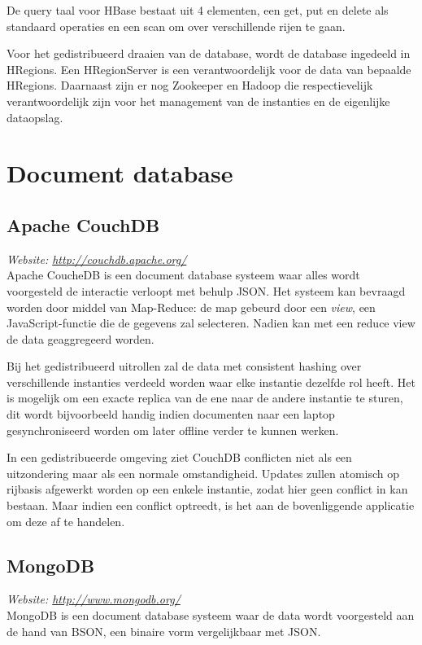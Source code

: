 De query taal voor HBase bestaat uit 4 elementen, een get, put en delete als standaard operaties en een scan om over verschillende rijen te gaan. 

Voor het gedistribueerd draaien van de database, wordt de database ingedeeld in HRegions. Een HRegionServer is een verantwoordelijk voor de data van bepaalde HRegions. Daarnaast zijn er nog Zookeeper en Hadoop die respectievelijk verantwoordelijk zijn voor het management van de instanties en de eigenlijke dataopslag.

\section{Document database}
\subsection{Apache CouchDB}
\textit{Website: \url{http://couchdb.apache.org/}}\\
Apache CoucheDB is een document database systeem waar alles wordt voorgesteld de interactie verloopt met behulp JSON. Het systeem kan bevraagd worden door middel van Map-Reduce: de map gebeurd door een \textit{view}, een JavaScript-functie die de gegevens zal selecteren. Nadien kan met een reduce view de data geaggregeerd worden. 

Bij het gedistribueerd uitrollen zal de data met consistent hashing over verschillende instanties verdeeld worden waar elke instantie dezelfde rol heeft. Het is mogelijk om een exacte replica van de ene naar de andere instantie te sturen, dit wordt bijvoorbeeld handig indien documenten naar een laptop gesynchroniseerd worden om later offline verder te kunnen werken.

In een gedistribueerde omgeving ziet CouchDB conflicten niet als een uitzondering maar als een normale omstandigheid. Updates zullen atomisch op rijbasis afgewerkt worden op een enkele instantie, zodat hier geen conflict in kan bestaan. Maar indien een conflict optreedt, is het aan de bovenliggende applicatie om deze af te handelen. 

\subsection{MongoDB}
\textit{Website: \url{http://www.mongodb.org/}}\\
MongoDB is een document database systeem waar de data wordt voorgesteld aan de hand van BSON, een binaire vorm vergelijkbaar met JSON. 

